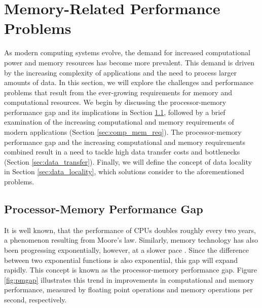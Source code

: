 \section{Memory-Related Performance Problems}\label{sec:background}


As modern computing systems evolve, the demand for increased computational power and memory resources has become more prevalent. This demand is driven by the increasing complexity of applications and the need to process larger amounts of data. In this section, we will explore the challenges and performance problems that result from the ever-growing requirements for memory and computational resources. We begin by discussing the processor-memory performance gap and its implications in Section \ref{sec:pmgap}, followed by a brief examination of the increasing computational and memory requirements of modern applications (Section \ref{sec:comp_mem_req}). The processor-memory performance gap and the increasing computational and memory requirements combined result in a need to tackle high data transfer costs and bottlenecks (Section \ref{sec:data_transfer}). Finally, we will define the concept of data locality in Section \ref{sec:data_locality}, which solutions consider to the aforementioned problems.

\subsection{Processor-Memory Performance Gap}\label{sec:pmgap}
It is well known, that the performance of CPUs doubles roughly every two years, a phenomenon resulting from Moore's law. Similarly, memory technology has also been progressing exponentially, however, at a slower pace \cite{efnusheva2017survey, machanick2002approaches, mckee2004reflections, mccalpin1997survey}. Since the difference between two exponential functions is also exponential, this gap will expand rapidly. This concept is known as the processor-memory performance gap. Figure \ref{fig:pmgap} illustrates this trend in improvements in computational and memory performance, measured by floating point operations and memory operations per second, respectively.

